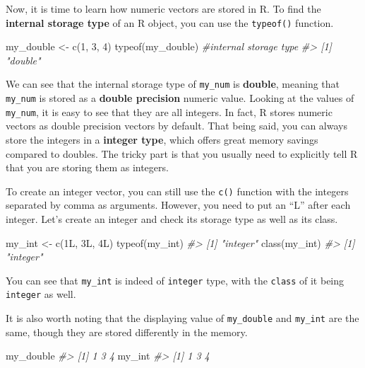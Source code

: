 \documentclass[
]{book}
\newenvironment{Shaded}{\begin{snugshade}}{\end{snugshade}}
\newcommand{\CommentTok}[1]{\textcolor[rgb]{0.56,0.35,0.01}{\textit{#1}}}
\newcommand{\DecValTok}[1]{\textcolor[rgb]{0.00,0.00,0.81}{#1}}
\newcommand{\FunctionTok}[1]{\textcolor[rgb]{0.00,0.00,0.00}{#1}}
\newcommand{\NormalTok}[1]{#1}
\newcommand{\OtherTok}[1]{\textcolor[rgb]{0.56,0.35,0.01}{#1}}
\begin{document}
Now, it is time to learn how numeric vectors are stored in R. To find the \textbf{internal storage type} of an R object, you can use the \texttt{typeof()} function.

\begin{Shaded}
\begin{Highlighting}[]
\NormalTok{my\_double }\OtherTok{\textless{}{-}} \FunctionTok{c}\NormalTok{(}\DecValTok{1}\NormalTok{, }\DecValTok{3}\NormalTok{, }\DecValTok{4}\NormalTok{)}
\FunctionTok{typeof}\NormalTok{(my\_double)         }\CommentTok{\#internal storage type}
\CommentTok{\#\textgreater{} [1] "double"}
\end{Highlighting}
\end{Shaded}

We can see that the internal storage type of \texttt{my\_num} is \textbf{double}, meaning that \texttt{my\_num} is stored as a \textbf{double precision} numeric value. Looking at the values of \texttt{my\_num}, it is easy to see that they are all integers. In fact, R stores numeric vectors as double precision vectors by default. That being said, you can always store the integers in a \textbf{integer type}, which offers great memory savings compared to doubles. The tricky part is that you usually need to explicitly tell R that you are storing them as integers.

To create an integer vector, you can still use the \texttt{c()} function with the integers separated by comma as arguments. However, you need to put an ``L'' after each integer. Let's create an integer and check its storage type as well as its class.

\begin{Shaded}
\begin{Highlighting}[]
\NormalTok{my\_int }\OtherTok{\textless{}{-}} \FunctionTok{c}\NormalTok{(1L, 3L, 4L)}
\FunctionTok{typeof}\NormalTok{(my\_int)}
\CommentTok{\#\textgreater{} [1] "integer"}
\FunctionTok{class}\NormalTok{(my\_int)}
\CommentTok{\#\textgreater{} [1] "integer"}
\end{Highlighting}
\end{Shaded}

You can see that \texttt{my\_int} is indeed of \texttt{integer} type, with the \texttt{class} of it being \texttt{integer} as well.

It is also worth noting that the displaying value of \texttt{my\_double} and \texttt{my\_int} are the same, though they are stored differently in the memory.

\begin{Shaded}
\begin{Highlighting}[]
\NormalTok{my\_double}
\CommentTok{\#\textgreater{} [1] 1 3 4}
\NormalTok{my\_int}
\CommentTok{\#\textgreater{} [1] 1 3 4}
\end{Highlighting}
\end{Shaded}
\end{document}
